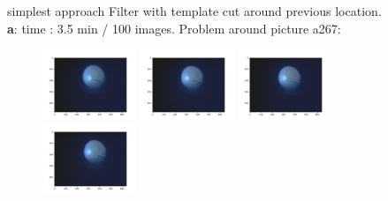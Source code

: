 \documentclass{beamer}              %
\begin{document}
\begin{frame}{simplest approach}
Filter with template cut around previous location. \\
\textbf{a}: time : 3.5 min / 100 images. Problem around picture a267:
\begin{figure}
    \centering
    \includegraphics[width=0.25\textwidth]{figs/simplest/000267.png}
    \includegraphics[width=0.25\textwidth]{figs/simplest/000268.png}
    \includegraphics[width=0.25\textwidth]{figs/simplest/000269.png}
    \includegraphics[width=0.25\textwidth]{figs/simplest/000270.png}
    

\end{figure}
\end{frame}
\end{document}
